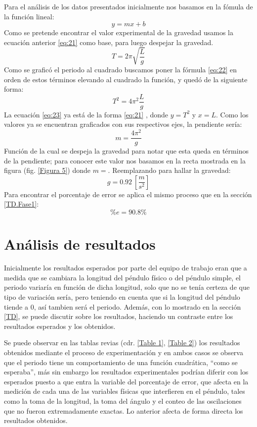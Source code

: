 \documentclass[spanish,notitlepage,letterpaper, 12pt]{article}
\begin{document}
Para el análisis de los datos presentados inicialmente nos basamos en la fómula de la función lineal:
\begin{equation} \label{eq:21}
    y=mx+b
\end{equation}
Como se pretende encontrar el valor experimental de la gravedad usamos la ecuación anterior \eqref{eq:21} como base, para luego despejar la gravedad.
\begin{equation} \label{eq:22}
    T=2\pi\sqrt{\frac{L}{g}}
\end{equation}
Como se graficó el periodo al cuadrado buscamos poner la fórmula \eqref{eq:22} en orden de estos términos elevando al cuadrado la función, y quedó de la siguiente forma:
\begin{equation} \label{eq:23}
    T^2=4\pi^2\frac{L}{g}
\end{equation}
La ecuación \eqref{eq:23} ya está de la forma \eqref{eq:21} , donde $y=T^2$ y $x=L$. Como los valores ya se encuentran graficados con sus respectivos ejes, la pendiente sería:
\begin{equation} 
    m=\frac{4\pi^2}{g}
\end{equation}
Función de la cual se despeja la gravedad para notar que esta queda en términos de la pendiente; para conocer este valor nos basamos en la recta mostrada en la figura (fig. \ref{Figura 5}) donde $m=$. Reemplazando para hallar la gravedad:
\begin{equation}
    g=0.92 \ [\frac{m}{s^2}]
\end{equation}
Para encontrar el porcentaje de error se aplica el mismo proceso que en la sección \ref{TD.Fase1}: $$\%e=90.8\%$$

\section{Análisis de resultados}

Inicialmente los resultados esperados por parte del equipo de trabajo eran que a medida que se cambiara la longitud del péndulo físico o del péndulo simple, el periodo variaría en función de dicha longitud, solo que no se tenía certeza de que tipo de variación sería, pero teniendo en cuenta que si
la longitud del péndulo tiende a 0, así tambien será el periodo. Además, con lo mostrado en la sección \ref{TD}, se puede discutir sobre los resultados, haciendo un contraste entre los resultados esperados y los obtenidos. \par
\bigskip
Se puede observar en las tablas revias (cdr. \ref{Table 1}, \ref{Table 2}) los resultados obtenidos mediante el proceso de experimentación y en ambos casos se observa que el periodo tiene un comportamiento de una función cuadrática, “como se esperaba”, más sin embargo los resultados experimentales podrían diferir con los esperados puesto a que entra la variable del porcentaje de error, que afecta en la medición de cada una de las variables físicas que interfieren en el péndulo, tales como la toma de la longitud, la toma del ángulo y el conteo de las oscilaciones que no fueron extremadamente exactas. Lo anterior afecta de forma directa los resultados obtenidos.
\end{document}
